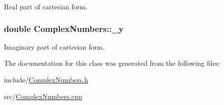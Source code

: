 Real part of cartesian form. 

\hypertarget{class_complex_numbers_aa11ffc8edeb15cbc67bc89edc9ed137d}{
\subsubsection[{\-\_\-y}]{\setlength{\rightskip}{0pt plus 5cm}double Complex\-Numbers\-::\-\_\-y}}\label{class_complex_numbers_aa11ffc8edeb15cbc67bc89edc9ed137d}


Imaginary part of cartesian form. 



The documentation for this class was generated from the following files\-:\begin{DoxyCompactItemize}
\item 
include/\hyperlink{_complex_numbers_8h}{Complex\-Numbers.\-h}\item 
src/\hyperlink{_complex_numbers_8cpp}{Complex\-Numbers.\-cpp}\end{DoxyCompactItemize}
